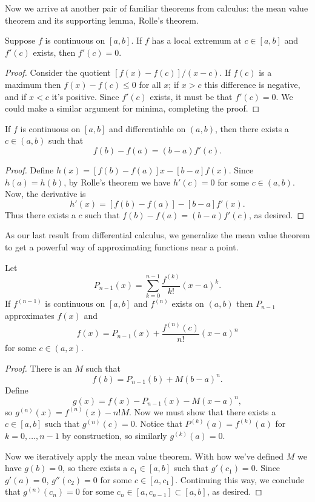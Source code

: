 \documentclass[../m131main.tex]{subfiles}
\begin{document}
Now we arrive at another pair of familiar theorems from calculus: the mean value theorem and its supporting lemma, Rolle's theorem.

\begin{lemma}
    Suppose $f$ is continuous on $[a,b]$.
    If $f$ has a local extremum at $c \in [a,b]$ and $f'(c)$ exists, then $f'(c) = 0$.
\end{lemma}

\begin{proof}
    Consider the quotient $[f(x) - f(c)] / (x-c)$.
    If $f(c)$ is a maximum then $f(x) - f(c) \leq 0$ for all $x$; if $x > c$ this difference is negative, and if $x < c$ it's positive.
    Since $f'(c)$ exists, it must be that $f'(c) = 0$.
    We could make a similar argument for minima, completing the proof.
\end{proof}

\begin{theorem}
    If $f$ is continuous on $[a,b]$ and differentiable on $(a,b)$, then there exists a $c \in (a,b)$ such that
    \[ f(b) - f(a) = (b-a) f'(c). \]
\end{theorem}

\begin{proof}
    Define $h(x) = [f(b) - f(a)]x - [b-a]f(x)$.
    Since $h(a) = h(b)$, by Rolle's theorem we have $h'(c) = 0$ for some $c \in (a,b)$.
    Now, the derivative is
    \[ h'(x) = [f(b) - f(a)] - [b-a]f'(x). \]
    Thus there exists a $c$ such that $f(b) - f(a) = (b-a) f'(c)$, as desired.
\end{proof}

As our last result from differential calculus, we generalize the mean value theorem to get a powerful way of approximating functions near a point.

\begin{theorem}
    Let
    \[ P_{n-1}(x) = \sum_{k=0}^{n-1} \frac{f^{(k)}}{k!} (x-a)^k. \]
    If $f^{(n-1)}$ is continuous on $[a,b]$ and $f^{(n)}$ exists on $(a,b)$ then $P_{n-1}$ approximates $f(x)$ and
    \[ f(x) = P_{n-1}(x) + \frac{f^{(n)}(c)}{n!} (x-a)^n \]
    for some $c \in (a,x)$.
\end{theorem}

\begin{proof}
    There is an $M$ such that
    \[ f(b) = P_{n-1}(b) + M(b-a)^{n}. \]
    Define
    \[ g(x) = f(x) - P_{n-1}(x) - M(x-a)^{n}, \]
    so $g^{(n)}(x) = f^{(n)}(x) - n!M$.
    Now we must show that there exists a $c \in [a,b]$ such that $g^{(n)}(c) = 0$.
    Notice that $P^{(k)}(a) = f^{(k)}(a)$ for $k = 0, \ldots, n-1$ by construction, so similarly $g^{(k)}(a) = 0$.

    Now we iteratively apply the mean value theorem.
    With how we've defined $M$ we have $g(b) = 0$, so there exists a $c_1 \in [a,b]$ such that $g'(c_1) = 0$.
    Since $g'(a) = 0$, $g''(c_2) = 0$ for some $c \in [a, c_1]$.
    Continuing this way, we conclude that $g^{(n)}(c_n) = 0$ for some $c_n \in [a, c_{n-1}] \subset [a,b]$, as desired.
\end{proof}
\end{document}
